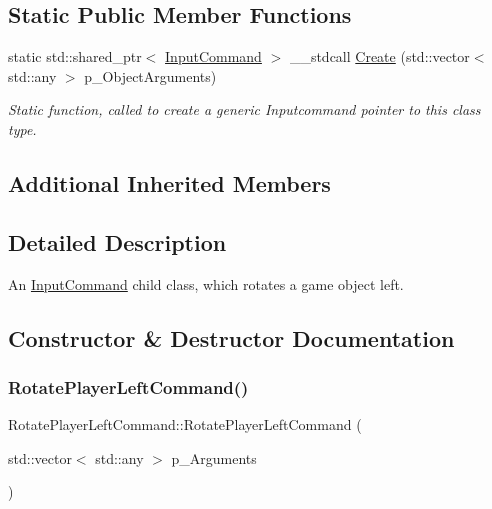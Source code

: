 \subsection*{Static Public Member Functions}
\begin{DoxyCompactItemize}
\item 
static std\+::shared\+\_\+ptr$<$ \mbox{\hyperlink{class_input_command}{Input\+Command}} $>$ \+\_\+\+\_\+stdcall \mbox{\hyperlink{class_rotate_player_left_command_aa41888f371f41c1687e7140d588f6a63}{Create}} (std\+::vector$<$ std\+::any $>$ p\+\_\+\+Object\+Arguments)
\begin{DoxyCompactList}\small\item\em Static function, called to create a generic Inputcommand pointer to this class type. \end{DoxyCompactList}\end{DoxyCompactItemize}
\subsection*{Additional Inherited Members}


\subsection{Detailed Description}
An \mbox{\hyperlink{class_input_command}{Input\+Command}} child class, which rotates a game object left. 

\subsection{Constructor \& Destructor Documentation}
\mbox{\label{class_rotate_player_left_command_ac36dd4cd757c103f54c98dd8fff8f320}} 
\subsubsection{\texorpdfstring{RotatePlayerLeftCommand()}{RotatePlayerLeftCommand()}}
{\footnotesize\ttfamily Rotate\+Player\+Left\+Command\+::\+Rotate\+Player\+Left\+Command (\begin{DoxyParamCaption}\item[{std\+::vector$<$ std\+::any $>$}]{p\+\_\+\+Arguments }\end{DoxyParamCaption})\hspace{0.3cm}{\ttfamily [inline]}}




